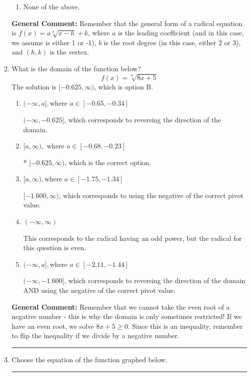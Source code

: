 \documentclass{extbook}[14pt]
\newcommand{\litem}[1]{\item #1

\rule{\textwidth}{0.4pt}}
\begin{document}
\begin{enumerate}
{\begin{enumerate}[label=\Alph*.]
\item None of the above.\end{enumerate}
\textbf{General Comment:} Remember that the general form of a radical equation is $ f(x) = a \sqrt[b]{x - h} + k $, where $a$ is the leading coefficient (and in this case, we assume is either 1 or -1), $b$ is the root degree (in this case, either 2 or 3), and $(h, k)$ is the vertex.
}
\litem{
What is the domain of the function below?
\[ f(x) = \sqrt[6]{8 x + 5} \]The solution is \( [-0.625, \infty) \), which is option B.\begin{enumerate}[label=\Alph*.]
\item \( (-\infty, a], \text{where } a \in [-0.65, -0.34] \)

 $(-\infty, -0.625]$, which corresponds to reversing the direction of the domain.
\item \( [a, \infty), \text{ where } a \in [-0.68, -0.23] \)

* $[-0.625, \infty)$, which is the correct option.
\item \( [a, \infty), \text{where } a \in [-1.75, -1.34] \)

$[-1.600, \infty)$, which corresponds to using the negative of the correct pivot value.
\item \( (-\infty, \infty) \)

This corresponds to the radical having an odd power, but the radical for this question is even.
\item \( (-\infty, a], \text{where } a \in [-2.11, -1.44] \)

$(-\infty, -1.600]$, which corresponds to reversing the direction of the domain AND using the negative of the correct pivot value.
\end{enumerate}

\textbf{General Comment:} Remember that we cannot take the even root of a negative number - this is why the domain is only sometimes restricted! If we have an even root, we solve $8 x + 5 \geq 0$. Since this is an inequality, remember to flip the inequality if we divide by a negative number.
}
\litem{
Choose the equation of the function graphed below.

}
\end{enumerate}
\end{document}
